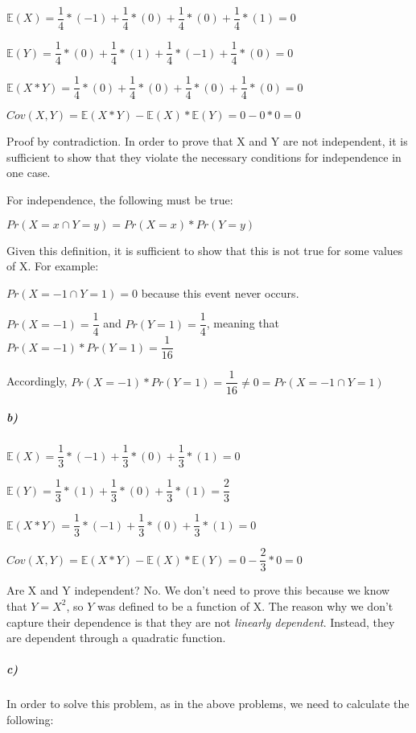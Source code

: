 \documentclass[12pt,letter]{article}\usepackage[]{graphicx}\usepackage[]{color}
\begin{document}
$\mathbb{E}(X) = \dfrac{1}{4}*(-1) + \dfrac{1}{4}*(0) + \dfrac{1}{4}*(0) + \dfrac{1}{4}*(1) = 0$

\bigskip

$\mathbb{E}(Y) = \dfrac{1}{4}*(0) + \dfrac{1}{4}*(1) + \dfrac{1}{4}*(-1) + \dfrac{1}{4}*(0) = 0$

\bigskip

$\mathbb{E}(X*Y) = \dfrac{1}{4}*(0) + \dfrac{1}{4}*(0) + \dfrac{1}{4}*(0) + \dfrac{1}{4}*(0) = 0$

\bigskip

$Cov(X, Y) = \mathbb{E}(X*Y)-\mathbb{E}(X)*\mathbb{E}(Y) = 0 - 0*0 = 0$

\bigskip

Proof by contradiction. In order to prove that X and Y are not independent, it is sufficient to show that they violate the necessary conditions for independence in one case.

For independence, the following must be true:

$Pr (X=x \cap Y=y) = Pr(X=x)*Pr(Y=y)$

Given this definition, it is sufficient to show that this is not true for some values of X. For example:

$Pr (X=-1 \cap Y=1) = 0$ because this event never occurs.

$Pr (X=-1) = \dfrac{1}{4}$ and $Pr (Y=1) = \dfrac{1}{4}$, meaning that $Pr (X=-1)*Pr(Y=1) = \dfrac{1}{16}$

Accordingly, $Pr (X=-1)*Pr(Y=1) = \dfrac{1}{16} \neq 0 = Pr (X=-1 \cap Y=1)$

\subparagraph{b)} $\mathbb{E}(X) = \dfrac{1}{3}*(-1) + \dfrac{1}{3}*(0) + \dfrac{1}{3}*(1) = 0$

$\mathbb{E}(Y) = \dfrac{1}{3}*(1) + \dfrac{1}{3}*(0) + \dfrac{1}{3}*(1) = \dfrac{2}{3}$

$\mathbb{E}(X*Y) = \dfrac{1}{3}*(-1) + \dfrac{1}{3}*(0) + \dfrac{1}{3}*(1) = 0$

$Cov (X, Y) = \mathbb{E}(X*Y) - \mathbb{E}(X)*\mathbb{E}(Y) = 0 - \dfrac{2}{3} * 0 = 0$

Are X and Y independent? No. We don't need to prove this because we know that $Y=X^2$, so $Y$ was defined to be a function of X. The reason why we don't capture their dependence is that they are not \textit{linearly dependent}. Instead, they are dependent through a quadratic function.

\subparagraph{c)} In order to solve this problem, as in the above problems, we need to calculate the following:
\end{document}

